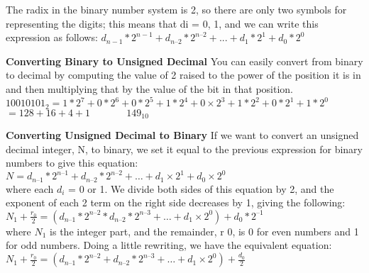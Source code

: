\documentclass[12pt]{extarticle}
\begin{document}
\vspace{18pt}
The radix in the binary number system is 2, so there are only two symbols for representing
the digits;  this means that di = 0, 1, and we can write this expression as follows:
$ d_{n-1} * 2^{n-1} + d_{n–2} * 2^{n–2} + ... + d_1 * 2^1 + d_0 * 2^0 $

\vspace{18pt}
\textbf{Converting Binary to Unsigned Decimal}
You can easily convert from binary to decimal by computing the value of 2 raised to the power
of  the position it is in and then multiplying that by the value of the bit in that position.
$ 10010101_2 = 1 * 2^7 + 0 * 2^6 + 0 * 2^5 + 1 * 2^4 + 0 × 2^3 + 1 * 2^2 + 0 * 2^1 + 1 * 2^0 $\\
$ = 128 + 16 + 4 + 1  \hspace{44pt} 149_{10} $

\vspace{18pt}
\textbf{Converting Unsigned Decimal to Binary}
If we want to convert an unsigned decimal integer, N, to binary, we set it equal to
the previous expression for binary numbers to give this equation: \\
$N = d_{n–1} * 2^{n–1} + d_{n–2} * 2^{n–2} + … + d_1 × 2^1 + d_0 × 2^0$ \\
where each $d_i$ = 0 or 1. We divide both sides of this equation by 2, and the
exponent of each 2 term on the right side decreases by 1, giving the following: \\
$N_1 + \frac{r_0}{2} = (d_{n–1} * 2^{n–2} * d_{n–2} * 2^{n–3} + … + d_1 × 2^0) + d_0 * 2^{–1}$ \\
where $N_1$ is the integer part, and the remainder, r 0, is 0 for even numbers and 1 for odd
numbers. Doing a little rewriting, we have the equivalent equation: \\
$ N_1 + \frac{r_0}{2} = (d_{n–1} * 2^{n–2} + d_{n–2} * 2^{n–3} + … + d_1 × 2^0) + \frac{d_0}{2}$
\end{document}
